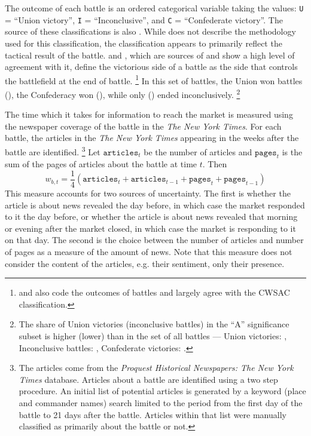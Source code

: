 \documentclass[11pt, oneside, article]{memoir}
\begin{document}
The outcome of each battle is an ordered categorical variable taking the values: \texttt{U} = ``Union victory'', \texttt{I} = ``Inconclusive'', and \texttt{C} = ``Confederate victory''.
The source of these classifications is also \textcite{CWSAC1993}. %
While \textcite{CWSAC1993} does not describe the methodology used for this classification, the classification appears to primarily reflect the tactical result of the battle. %
\textcite{fox1898regimental} and \textcite{Livermore1900}, which are sources of \textcite{CWSAC1993} and show a high level of agreement with it, define the victorious side of a battle as the side that controls the battlefield at the end of battle.%
\footnote{\textcite{Bodart1908} and \textcite{cdb90} also code the outcomes of battles and largely agree with the CWSAC classification.} %
In this set of battles, the Union won battles \AcwBattleSigAOutcomeU{} (\AcwBattleSigAOutcomeUPct{}), the Confederacy won \AcwBattleSigAOutcomeC{} (\AcwBattleSigAOutcomeCPct{}), while only \AcwBattleSigAOutcomeI{} (\AcwBattleSigAOutcomeIPct{}) ended inconclusively.%
\footnote{The share of Union victories (inconclusive battles) in the ``A'' significance subset is higher (lower) than in the set of all battles --- Union victories: \AcwBattleOutcomeUPct{}, Inconclusive battles: \AcwBattleOutcomeIPct{}, Confederate victories: \AcwBattleOutcomeCPct{}.}

The time which it takes for information to reach the market is measured using the newspaper coverage of the battle in the  \textit{The New York Times}.
For each battle, the articles in the \textit{The New York Times} appearing in the weeks after the battle are identified.%
\footnote{
  The articles come from the \textit{Proquest Historical Newspapers: The New York Times} database.
  Articles about a battle are identified using a two step procedure. An initial list of potential articles is generated by a keyword (place and commander names) search limited to the period from the first day of the battle to 21 days after the battle.
  Articles within that list were manually classified as primarily about the battle or not.
}
Let $\mathtt{articles}_{t}$ be the number of articles and $\mathtt{pages}_{t}$ is the sum of the pages of articles about the battle at time $t$.
Then 
\begin{equation}
  \label{eq:4}
  w_{b,t} = \frac{1}{4} \left( \mathtt{articles}_{t} + \mathtt{articles}_{t-1} + \mathtt{pages}_{t} + \mathtt{pages}_{t-1} \right)
\end{equation}
This measure accounts for two sources of uncertainty.
The first is whether the article is about news revealed the day before, in which case the market responded to it the day before, or whether the article is about news revealed that morning or evening after the market closed, in which case the market is responding to it on that day.
The second is the choice between the number of articles and number of pages as a measure of the amount of news. 
Note that this measure does not consider the content of the articles, e.g. their sentiment, only their presence.
\end{document}
